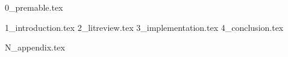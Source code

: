 \documentclass[ %
                    author={Oliver Ryan-George},
                supervisor={Dr. Miranda Mowbray},
                    degree={BSc},
                     title={Natural Language Processing in Intersecting Fields of Law},
                  subtitle={},
                      year={2019} ]{resources/dissertation}
\begin{document}

\maketitle


\frontmatter


\makedecl



\newpage
{0_premable.tex}



\mainmatter
{1_introduction.tex}
{2_litreview.tex}
{3_implementation.tex}
{4_conclusion.tex}


\backmatter
\begingroup
    \renewcommand\bibname{References \vspace*{-10mm}}
    \scriptsize
    \setlength\bibitemsep{5pt}
    \printbibliography
\endgroup
{N_appendix.tex}
\end{document}
